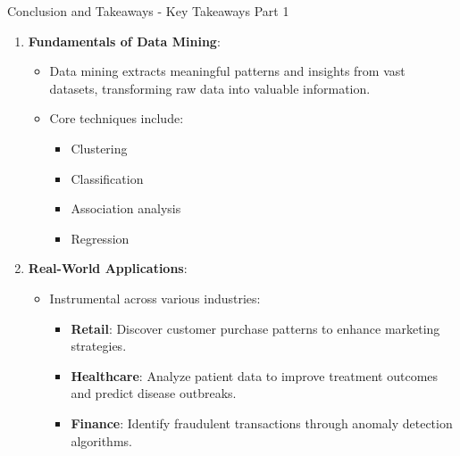 \documentclass[aspectratio=169]{beamer}
\begin{document}
\begin{frame}[fragile]{Conclusion and Takeaways - Key Takeaways Part 1}
    \begin{enumerate}
        \item \textbf{Fundamentals of Data Mining}:
            \begin{itemize}
                \item Data mining extracts meaningful patterns and insights from vast datasets, transforming raw data into valuable information.
                \item Core techniques include:
                    \begin{itemize}
                        \item Clustering
                        \item Classification
                        \item Association analysis
                        \item Regression
                    \end{itemize}
            \end{itemize}

        \item \textbf{Real-World Applications}:
            \begin{itemize}
                \item Instrumental across various industries:
                    \begin{itemize}
                        \item \textbf{Retail}: Discover customer purchase patterns to enhance marketing strategies.
                        \item \textbf{Healthcare}: Analyze patient data to improve treatment outcomes and predict disease outbreaks.
                        \item \textbf{Finance}: Identify fraudulent transactions through anomaly detection algorithms.
                    \end{itemize}
            \end{itemize}
    \end{enumerate}
\end{frame}
\end{document}
